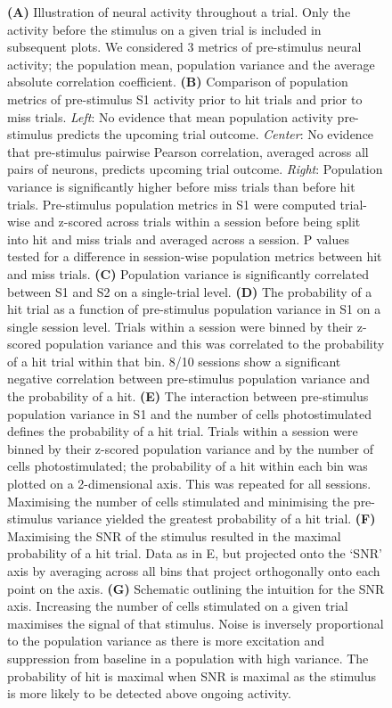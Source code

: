 \begin{figure}[h!]
{\textbf{(A)} Illustration of neural activity throughout a trial. Only the activity before the stimulus on a given trial is included in subsequent plots. We considered 3 metrics of pre-stimulus neural activity; the population mean, population variance and the average absolute correlation coefficient. \textbf{(B)} Comparison of population metrics of pre-stimulus S1 activity prior to hit trials and prior to miss trials. \textit{Left}: No evidence that mean population activity pre-stimulus predicts the upcoming trial outcome. \textit{Center}: No evidence that pre-stimulus pairwise Pearson correlation, averaged across all pairs of neurons, predicts upcoming trial outcome. \textit{Right}: Population variance is significantly higher before miss trials than before hit trials. Pre-stimulus population metrics in S1 were computed trial-wise and z-scored across trials within a session before being split into hit and miss trials and averaged across a session. P values tested for a difference in session-wise population metrics between hit and miss trials. \textbf{(C)} Population variance is significantly correlated between S1 and S2 on a single-trial level. \textbf{(D)} The probability of a hit trial as a function of pre-stimulus population variance in S1 on a single session level. Trials within a session were binned by their z-scored population variance and this was correlated to the probability of a hit trial within that bin. 8/10 sessions show a significant negative correlation between pre-stimulus population variance and the probability of a hit. \textbf{(E)} The interaction between pre-stimulus population variance in S1 and the number of cells photostimulated defines the probability of a hit trial. Trials within a session were binned by their z-scored population variance and by the number of cells photostimulated; the probability of a hit within each bin was plotted on a 2-dimensional axis. This was repeated for all sessions. Maximising the number of cells stimulated and minimising the pre-stimulus variance yielded the greatest probability of a hit trial. \textbf{(F)} Maximising the SNR of the stimulus resulted in the maximal probability of a hit trial. Data as in E, but projected onto the ‘SNR’ axis by averaging across all bins that project orthogonally onto each point on the axis. \textbf{(G)} Schematic outlining the intuition for the SNR axis. Increasing the number of cells stimulated on a given trial maximises the signal of that stimulus. Noise is inversely proportional to the population variance as there is more excitation and suppression from baseline in a population with high variance. The probability of hit is maximal when SNR is maximal as the stimulus is more likely to be detected above ongoing activity. 
} 
\label{fig:figure4}
\end{figure}

